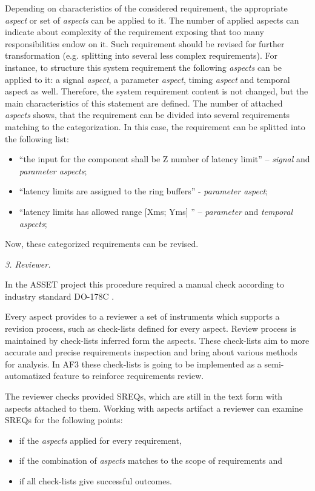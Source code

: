 Depending on characteristics of the considered requirement, the appropriate \textit{aspect }or set of \textit{aspects} can be applied to it. The number of applied aspects can indicate about complexity of the requirement exposing that too many responsibilities endow on it. Such requirement should be revised for further transformation (e.g. splitting into several less complex requirements). For instance, to structure this system requirement the following \textit{aspects} can be applied to it: a signal \textit{aspect}, a parameter \textit{aspect}, timing \textit{aspect} and temporal aspect as well. Therefore, the system requirement content is not changed, but the main characteristics of this statement are defined. The number of attached \textit{aspects} shows, that the requirement can be divided into several requirements matching to the categorization. In this case, the requirement can be splitted into the following list:
\begin{itemize}
 \item “the input for the component shall be Z number of latency limit” – \textit{signal} and \textit{parameter aspects};
 \item “latency limits are assigned to the ring buffers” - \textit{parameter aspect};
 \item “latency limits has allowed range [Xms; Yms] ” – \textit{parameter} and \textit{temporal aspects};
\end{itemize}

Now, these categorized requirements can be revised.

\textit{3. Reviewer.}

In the ASSET project this procedure required a manual check according to industry standard DO-178C \cite{7DO-178C}. 

Every aspect provides to a reviewer a set of instruments which supports a revision process, such as check-lists defined for every aspect. Review process is maintained by check-lists inferred form the aspects. These check-lists aim to more accurate and precise requirements inspection and bring about various methods for analysis. In AF3 these check-lists is going to be implemented as a semi-automatized feature to reinforce requirements review.

The reviewer checks provided SREQs, which are still in the text form with aspects attached to them. 
Working with aspects artifact a reviewer can examine SREQs for the following points:
\begin{itemize}
	\item if the \textit{aspects} applied for every requirement,
  \item if the combination of \textit{aspects} matches to the scope of requirements and
	\item if all check-lists give successful outcomes.
\end{itemize}

